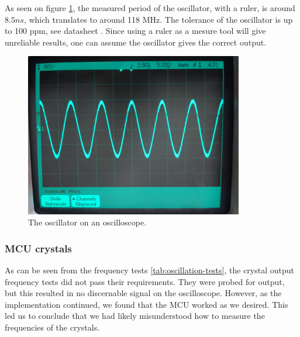\documentclass[../main/report.tex]{subfiles}
\begin{document}
As seen on figure \ref{fig:oscillator-scope}, the measured period of the oscillator, with a ruler, is around $8.5 ns$, which translates to around 118 MHz.
The tolerance of the oscillator is up to 100 ppm, see datasheet \cite{xpresso-oscillator}.
Since using a ruler as a mesure tool will give unreliable results, one can assume the oscillator gives the correct output.
\begin{figure}[H]
		\centering
		\includegraphics[width=0.85\textwidth]{../discussion/assets/oscillator.jpg}
		\caption{The oscillator on an oscilloscope.}
		\label{fig:oscillator-scope}
\end{figure}

\subsubsection*{MCU crystals}
As can be seen from the frequency tests \ref{tab:oscillation-tests}, the crystal output frequency tests did not pass their requirements.
They were probed for output, but this resulted in no discernable signal on the oscilloscope.
However, as the implementation continued, we found that the MCU worked as we desired.
This led us to conclude that we had likely misunderstood how to measure the frequencies of the crystals.


\end{document}

